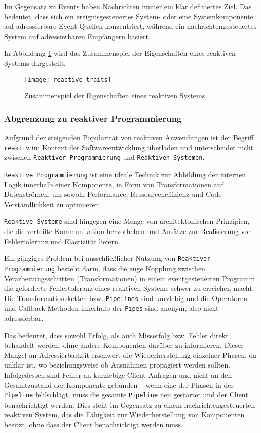 Im Gegensatz zu Events haben Nachrichten immer ein klar definiertes Ziel.
Das bedeutet, dass sich ein ereignisgesteuertes System- oder eine Systemkomponente auf adressierbare Event-Quellen konzentriert,
während ein nachrichtengesteuertes System auf adressierbaren Empfängern basiert.

In Abbildung \ref{fig:reactive-traits} wird das Zusammenspiel der Eigenschaften eines reaktiven Systems dargestellt.

\begin{figure}[h]
	\centering
	\texttt{[image: reactive-traits]}
	\caption{Zusammenspiel der Eigenschaften eines reaktiven Systems \parencite{ReactiveSystems}}
	\label{fig:reactive-traits}
\end{figure}

\subsubsection{Abgrenzung zu reaktiver Programmierung}
\label{subsubsection:abgrenzung_reaktive_programmierung}
Aufgrund der steigenden Popularität von reaktiven Anwendungen ist der Begriff \verb|reaktiv| im Kontext der Softwareentwicklung
überladen und unterscheidet nicht zwischen \linebreak\verb|Reaktiver Programmierung| und \verb|Reaktiven Systemen|.

\verb|Reaktive Programmierung| ist eine ideale Technik zur Abbildung der internen Logik innerhalb einer Komponente, in Form von Transformationen
auf Datenströmen, um sowohl Performance, Ressourceneffizienz und Code-Verständlichkeit zu optimieren.

\verb|Reaktive Systeme| sind hingegen eine Menge von architektonischen Prinzipien, die die verteilte Kommunikation hervorheben und
Ansätze zur Realisierung von Fehlertoleranz und Elastizität liefern.

Ein gängiges Problem bei ausschließlicher Nutzung von \verb|Reaktiver Programmierung| besteht darin, dass die enge Kopplung
zwischen Verarbeitungsschritten (Transformationen) in einem eventgesteuerten Programm die geforderte Fehlertoleranz eines reaktiven Systems
schwer zu erreichen macht.
Die Transformationsketten bzw. \verb|Pipelines| sind kurzlebig und die Operatoren und Callback-Methoden innerhalb der \verb|Pipes|
sind anonym, also nicht adressierbar.

Das bedeutet, dass sowohl Erfolg, als auch Misserfolg bzw. Fehler direkt behandelt werden, ohne andere Komponenten darüber zu informieren.
Dieser Mangel an Adressierbarkeit erschwert die Wiederherstellung einzelner Phasen, da unklar ist, wo beziehungsweise ob Ausnahmen
propagiert werden sollten. Infolgedessen sind Fehler an kurzlebige Client-Anfragen und nicht an den
Gesamtzustand der Komponente gebunden – wenn eine der Phasen in der \verb|Pipeline| fehlschlägt, muss die gesamte \verb|Pipeline| neu
gestartet und der Client benachrichtigt werden. Dies steht im Gegensatz zu einem nachrichtengesteuerten reaktiven System, das
die Fähigkeit zur Wiederherstellung von Komponenten besitzt, ohne dass der Client benachrichtigt werden muss.

